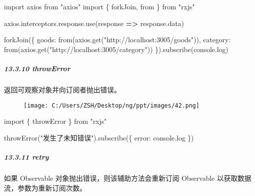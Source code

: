 \documentclass[
]{article}
\newenvironment{Shaded}{}{}
\newcommand{\AttributeTok}[1]{\textcolor[rgb]{0.49,0.56,0.16}{#1}}
\newcommand{\BuiltInTok}[1]{#1}
\newcommand{\DataTypeTok}[1]{\textcolor[rgb]{0.56,0.13,0.00}{#1}}
\newcommand{\FunctionTok}[1]{\textcolor[rgb]{0.02,0.16,0.49}{#1}}
\newcommand{\ImportTok}[1]{#1}
\newcommand{\KeywordTok}[1]{\textcolor[rgb]{0.00,0.44,0.13}{\textbf{#1}}}
\newcommand{\NormalTok}[1]{#1}
\newcommand{\OperatorTok}[1]{\textcolor[rgb]{0.40,0.40,0.40}{#1}}
\newcommand{\StringTok}[1]{\textcolor[rgb]{0.25,0.44,0.63}{#1}}
\begin{document}
\begin{Shaded}
\begin{Highlighting}[]
\ImportTok{import}\NormalTok{ axios }\ImportTok{from} \StringTok{"axios"}
\ImportTok{import}\NormalTok{ \{ forkJoin}\OperatorTok{,} \ImportTok{from}\NormalTok{ \} }\ImportTok{from} \StringTok{"rxjs"}

\NormalTok{axios}\OperatorTok{.}\AttributeTok{interceptors}\OperatorTok{.}\AttributeTok{response}\OperatorTok{.}\FunctionTok{use}\NormalTok{(response }\KeywordTok{=\textgreater{}}\NormalTok{ response}\OperatorTok{.}\AttributeTok{data}\NormalTok{)}

\FunctionTok{forkJoin}\NormalTok{(\{}
  \DataTypeTok{goods}\OperatorTok{:} \ImportTok{from}\NormalTok{(axios}\OperatorTok{.}\FunctionTok{get}\NormalTok{(}\StringTok{"http://localhost:3005/goods"}\NormalTok{))}\OperatorTok{,}
  \DataTypeTok{category}\OperatorTok{:} \ImportTok{from}\NormalTok{(axios}\OperatorTok{.}\FunctionTok{get}\NormalTok{(}\StringTok{"http://localhost:3005/category"}\NormalTok{))}
\NormalTok{\})}\OperatorTok{.}\FunctionTok{subscribe}\NormalTok{(}\BuiltInTok{console}\OperatorTok{.}\FunctionTok{log}\NormalTok{)}
\end{Highlighting}
\end{Shaded}

\hypertarget{13310-throwerror}{%
\subparagraph{13.3.10 throwError}\label{13310-throwerror}}

返回可观察对象并向订阅者抛出错误。

\begin{figure}
\centering
\texttt{[image: C:/Users/ZSH/Desktop/ng/ppt/images/42.png]}
\caption{}
\end{figure}

\begin{Shaded}
\begin{Highlighting}[]
\ImportTok{import}\NormalTok{ \{ throwError \} }\ImportTok{from} \StringTok{"rxjs"}

\FunctionTok{throwError}\NormalTok{(}\StringTok{"发生了未知错误"}\NormalTok{)}\OperatorTok{.}\FunctionTok{subscribe}\NormalTok{(\{ }\DataTypeTok{error}\OperatorTok{:} \BuiltInTok{console}\OperatorTok{.}\FunctionTok{log}\NormalTok{ \})}
\end{Highlighting}
\end{Shaded}

\hypertarget{13311-retry}{%
\subparagraph{13.3.11 retry}\label{13311-retry}}

如果 Observable 对象抛出错误，则该辅助方法会重新订阅 Observable
以获取数据流，参数为重新订阅次数。
\end{document}
